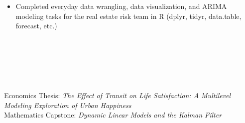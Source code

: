 \documentclass[10pt,a4paper,ragged2e,withhyper]{altacv}
\begin{document}
\begin{paracol}{2}
		\divider
		
		\begin{itemize}
			\item Completed everyday data wrangling, data visualization, and ARIMA modeling tasks for the real estate risk team in R (dplyr, tidyr, data.table, forecast, etc.)
		\end{itemize}
		
%		
%		
%		
%		
		
		\switchcolumn
		
		
		\\
		\\
		
		\divider\smallskip
		
		\\
		\\
		
		
		\divider
		
		\divider
		
		\divider
		
		\divider
		
		
		\medskip
		
		
		Economics Thesis: \textit{The Effect of Transit on Life Satisfaction: A Multilevel Modeling Exploration of Urban Happiness}\\
		\smallskip
		Mathematics Capstone: \textit{Dynamic Linear Models and the Kalman Filter}
		

\end{paracol}
\end{document}
